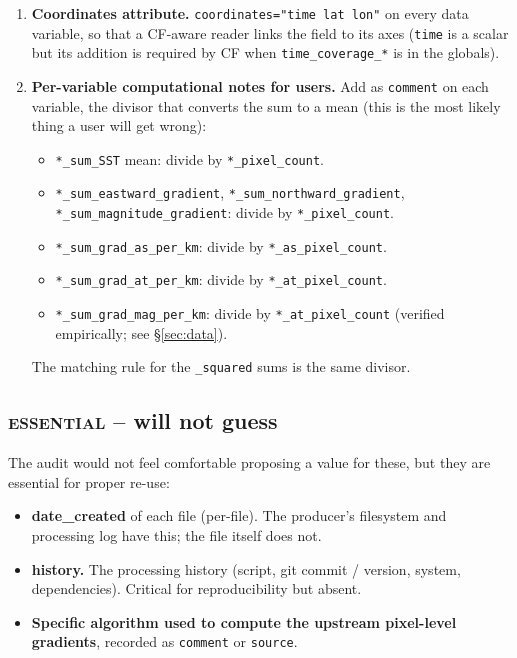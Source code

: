 \documentclass[11pt]{article}
\newcommand{\nc}{\textbf{will not guess}}
\newcommand{\es}{\textsc{essential}}
\begin{document}
\begin{enumerate}
  \item \textbf{Coordinates attribute.}
    \texttt{coordinates="time lat lon"} on every data variable,
    so that a CF-aware reader links the field to its axes
    (\texttt{time} is a scalar but its addition is required by
    CF when \texttt{time\_coverage\_*} is in the globals).

  \item \textbf{Per-variable computational notes for users.}
    Add as \texttt{comment} on each variable, the divisor that
    converts the sum to a mean (this is the most likely thing a
    user will get wrong):
    \begin{itemize}[topsep=0pt]
      \item \texttt{*\_sum\_SST} mean: divide by
        \texttt{*\_pixel\_count}.
      \item \texttt{*\_sum\_eastward\_gradient},
        \texttt{*\_sum\_northward\_gradient},
        \texttt{*\_sum\_magnitude\_gradient}: divide by
        \texttt{*\_pixel\_count}.
      \item \texttt{*\_sum\_grad\_as\_per\_km}: divide by
        \texttt{*\_as\_pixel\_count}.
      \item \texttt{*\_sum\_grad\_at\_per\_km}: divide by
        \texttt{*\_at\_pixel\_count}.
      \item \texttt{*\_sum\_grad\_mag\_per\_km}: divide by
        \texttt{*\_at\_pixel\_count} (verified empirically; see
        \S\ref{sec:data}).
    \end{itemize}
    The matching rule for the \texttt{\_squared} sums is the
    same divisor.
\end{enumerate}

\subsection{\es{} -- \nc{}}\label{sec:es-nc}

The audit would not feel comfortable proposing a value for these,
but they are essential for proper re-use:

\begin{itemize}
  \item \textbf{date\_created} of each file (per-file).
    The producer's filesystem and processing log have this; the
    file itself does not.
  \item \textbf{history.} The processing history (script,
    git commit / version, system, dependencies). Critical for
    reproducibility but absent.
  \item \textbf{Specific algorithm used to compute the
    upstream pixel-level gradients}, recorded as
    \texttt{comment} or \texttt{source}.
\end{itemize}
\end{document}
